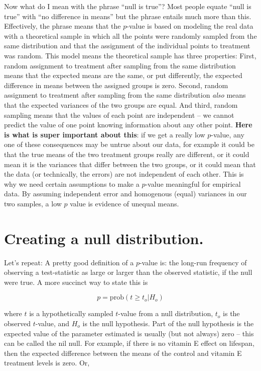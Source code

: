 \documentclass[]{book}
\begin{document}
Now what do I mean with the phrase ``null is true''? Most people equate
``null is true'' with ``no difference in means'' but the phrase entails
much more than this. Effectively, the phrase means that the \(p\)-value
is based on modeling the real data with a theoretical sample in which
all the points were randomly sampled from the same distribution and that
the assignment of the individual points to treatment was random. This
model means the theoretical sample has three properties: First, random
assignment to treatment after sampling from the same distribution means
that the expected means are the same, or put differently, the expected
difference in means between the assigned groups is zero. Second, random
assignment to treatment after sampling from the same distribution
\emph{also} means that the expected variances of the two groups are
equal. And third, random sampling means that the values of each point
are independent -- we cannot predict the value of one point knowing
information about any other point. \textbf{Here is what is super
important about this}: if we get a really low \(p\)-value, any one of
these consequences may be untrue about our data, for example it could be
that the true means of the two treatment groups really are different, or
it could mean it is the variances that differ between the two groups, or
it could mean that the data (or technically, the errors) are not
independent of each other. This is why we need certain assumptions to
make a \(p\)-value meaningful for empirical data. By assuming
independent error and homogenous (equal) variances in our two samples, a
low \(p\) value is evidence of unequal means.

\section{Creating a null
distribution.}\label{creating-a-null-distribution.}

Let's repeat: A pretty good definition of a \(p\)-value is: the long-run
frequency of observing a test-statistic as large or larger than the
observed statistic, if the null were true. A more succinct way to state
this is

\begin{equation}
p = \mathrm{prob}(t \ge t_o | H_o)
\end{equation}

where \(t\) is a hypothetically sampled \(t\)-value from a null
distribution, \(t_o\) is the observed \(t\)-value, and \(H_o\) is the
null hypothesis. Part of the null hypothesis is the expected value of
the parameter estimated is usually (but not always) zero -- this can be
called the nil null. For example, if there is no vitamin E effect on
lifespan, then the expected difference between the means of the control
and vitamin E treatment levels is zero. Or,
\end{document}
